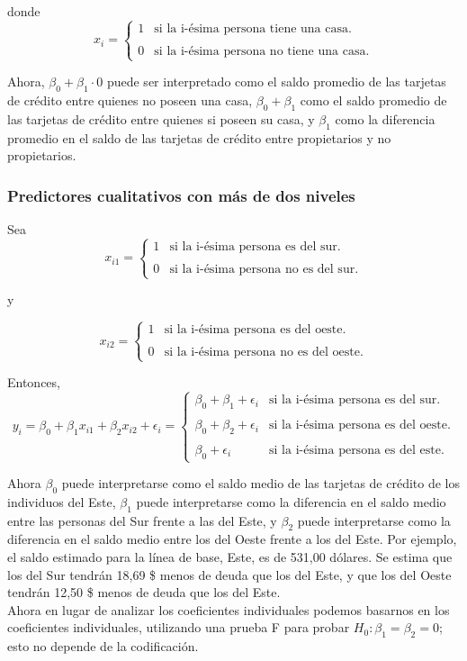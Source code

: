 donde 
$$
x_i=
\left\{
\begin{array}{ll}
	1 & \text{si la i-ésima persona tiene una casa.}\\\\
	0 & \text{si la i-ésima persona no tiene una casa.}
\end{array}
\right.
$$

Ahora, $\beta_0+\beta_1\cdot 0$ puede ser interpretado como el saldo promedio de las tarjetas de crédito entre quienes no poseen una casa, $\beta_0+\beta_1$ como el saldo promedio de las tarjetas de crédito entre quienes si poseen su casa, y $\beta_1$ como la diferencia promedio en el saldo de las tarjetas de crédito entre propietarios y no propietarios.


\subsubsection{Predictores cualitativos con más de dos niveles}

Sea 
$$
x_{i1}=
\left\{
\begin{array}{ll}
    1 & \text{si la i-ésima persona es del sur.}\\\\
    0 & \text{si la i-ésima persona no es del sur.}
\end{array}
\right.
$$

y 

$$
x_{i2}=
\left\{
\begin{array}{ll}
    1 & \text{si la i-ésima persona es del oeste.}\\\\
    0 & \text{si la i-ésima persona no es del oeste.}
\end{array}
\right.
$$

Entonces,
$$
y_i=\beta_0+\beta_1x_{i1}+\beta_2x_{i2}+\epsilon_i
=
\left\{
    \begin{array}{ll}
	\beta_0+\beta_1+\epsilon_i & \text{si la i-ésima persona es del sur.}\\\\
	\beta_0+\beta_2+\epsilon_i & \text{si la i-ésima persona es del oeste.}\\\\
	\beta_0+\epsilon_i & \text{si la i-ésima persona es del este.}
    \end{array}
\right.
$$

Ahora $\beta_0$ puede interpretarse como el saldo medio de las tarjetas de crédito de los individuos del Este, $\beta_1$ puede interpretarse como la diferencia en el saldo medio entre las personas del Sur frente a las del Este, y $\beta_2$ puede interpretarse como la diferencia en el saldo medio entre los del Oeste frente a los del Este. Por ejemplo, el saldo estimado para la línea de base, Este, es de 531,00 dólares. Se estima que los del Sur tendrán 18,69 \$ menos de deuda que los del Este, y que los del Oeste tendrán 12,50 \$ menos de deuda que los del Este. \\
Ahora en lugar de analizar los coeficientes individuales podemos basarnos en los coeficientes individuales, utilizando una prueba F para probar $H_0: \beta_1 = \beta_2 = 0$; esto no depende de la codificación. 

